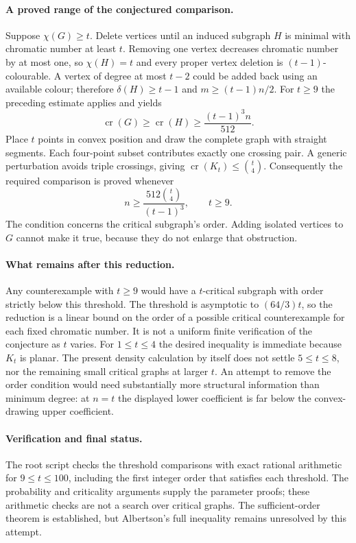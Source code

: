 \documentclass[11pt,a4paper]{article}
\begin{document}
\paragraph{A proved range of the conjectured comparison.}
Suppose $\chi(G)\ge t$. Delete vertices until an induced
subgraph $H$ is minimal with chromatic number at least $t$.
Removing one vertex decreases chromatic number by at most one,
so $\chi(H)=t$ and every proper vertex deletion is
$(t-1)$-colourable. A vertex of degree at most $t-2$ could be
added back using an available colour; therefore
$\delta(H)\ge t-1$ and $m\ge(t-1)n/2$.
For $t\ge9$ the preceding estimate applies and yields
\[
 \operatorname{cr}(G)\ge\operatorname{cr}(H)
 \ge\frac{(t-1)^3n}{512}.
\]
Place $t$ points in convex position and draw the complete graph
with straight segments. Each four-point subset contributes
exactly one crossing pair. A generic perturbation avoids triple
crossings, giving $\operatorname{cr}(K_t)\le\binom t4$.
Consequently the required comparison is proved whenever
\[
       n\ge\frac{512\binom t4}{(t-1)^3},\qquad t\ge9.
\]
The condition concerns the critical subgraph's order. Adding
isolated vertices to $G$ cannot make it true, because they do
not enlarge that obstruction.

\paragraph{What remains after this reduction.}
Any counterexample with $t\ge9$ would have a $t$-critical
subgraph with order strictly below this threshold. The threshold
is asymptotic to $(64/3)t$, so the reduction is a linear bound
on the order of a possible critical counterexample for each
fixed chromatic number. It is not a uniform finite verification
of the conjecture as $t$ varies.
For $1\le t\le4$ the desired inequality is immediate because
$K_t$ is planar. The present density calculation by itself
does not settle $5\le t\le8$, nor the remaining small critical
graphs at larger $t$. An attempt to remove the order condition
would need substantially more structural information than
minimum degree: at $n=t$ the displayed lower coefficient is
far below the convex-drawing upper coefficient.

\paragraph{Verification and final status.}
The root script checks the threshold comparisons with exact
rational arithmetic for $9\le t\le100$, including the first
integer order that satisfies each threshold. The probability
and criticality arguments supply the parameter proofs; these
arithmetic checks are not a search over critical graphs.
The sufficient-order theorem is established, but Albertson's
full inequality remains unresolved by this attempt.
\end{document}
